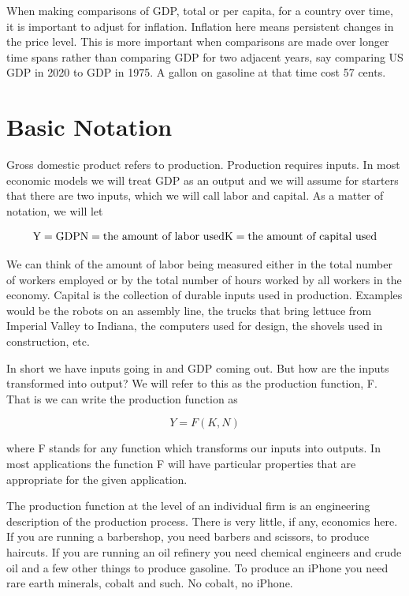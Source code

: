 \documentclass[
]{book}
\begin{document}
When making comparisons of GDP, total or per capita, for a country over time, it is important to adjust for inflation. Inflation here means persistent changes in the price level. This is more important when comparisons are made over longer time spans rather than comparing GDP for two adjacent years, say comparing US GDP in 2020 to GDP in 1975. A gallon on gasoline at that time cost 57 cents.

\hypertarget{basic-notation}{%
\section{Basic Notation}\label{basic-notation}}

Gross domestic product refers to production. Production requires inputs. In most economic models we will treat GDP as an output and we will assume for starters that there are two inputs, which we will call labor and capital. As a matter of notation, we will let

\[ \text{Y} = \text{GDP} \newline 
\text{N} = \text{the amount of labor used} \newline
\text{K} = \text{the amount of capital used} \]

We can think of the amount of labor being measured either in the total number of workers employed or by the total number of hours worked by all workers in the economy. Capital is the collection of durable inputs used in production. Examples would be the robots on an assembly line, the trucks that bring lettuce from Imperial Valley to Indiana, the computers used for design, the shovels used in construction, etc.

In short we have inputs going in and GDP coming out. But how are the inputs transformed into output? We will refer to this as the production function, F. That is we can write the production function as

\[Y = F(K,N)\]

where F stands for any function which transforms our inputs into outputs. In most applications the function F will have particular properties that are appropriate for the given application.

The production function at the level of an individual firm is an engineering description of the production process. There is very little, if any, economics here. If you are running a barbershop, you need barbers and scissors, to produce haircuts. If you are running an oil refinery you need chemical engineers and crude oil and a few other things to produce gasoline. To produce an iPhone you need rare earth minerals, cobalt and such. No cobalt, no iPhone.
\end{document}
